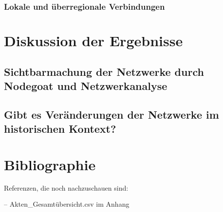 \documentclass[12pt, a4paper, ngerman, bidi=default]{article}
\begin{document}
  \subsubsection{ Lokale und überregionale Verbindungen}
  \newpage
\section{Diskussion der Ergebnisse}
  \subsection{Sichtbarmachung der Netzwerke durch Nodegoat und Netzwerkanalyse}
  \subsection{Gibt es Veränderungen der Netzwerke im historischen Kontext?}
  \newpage

\section{Bibliographie}

Referenzen, die noch nachzuschauen sind:

-- Akten\_Gesamtübersicht.csv im Anhang
\printbibliography[
heading=bibintoc,
title={References} %
]
\end{document}
